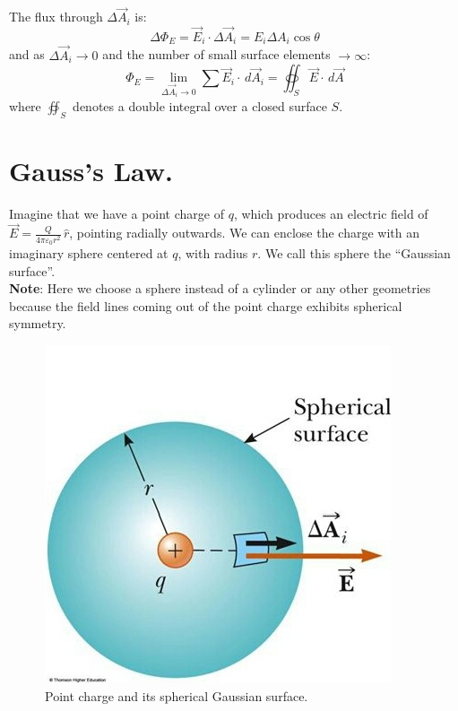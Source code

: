 \documentclass[11pt, letterpaper]{article}
\begin{document}
	The flux through $\Delta\vec{A}_i$ is: \[\Delta \Phi_E = \vec{E}_i\cdot\Delta\vec{A}_i = E_i
	\Delta A_i\cos\theta\] and as $\Delta\vec{A}_i \to 0$ and the number of small surface elements
	$\to \infty$:
	\begin{equation}
		\boxed{\Phi_E = \lim_{\Delta \vec{A}_i \to 0}\sum\vec{E}_i\cdot\, d\vec{A}_i = \oiint_S\vec{E}
		\cdot\, d\vec{A}}
	\end{equation}
	where $\oiint_S$ denotes a double integral over a closed surface $S$.
	
	\section{Gauss's Law.}
	Imagine that we have a point charge of $q$, which produces an electric field of $\vec{E} = 
	\frac{Q}{4\pi\varepsilon_0r^2}\,\hat{r}$, pointing radially outwards. We can enclose the
	charge with an imaginary sphere centered at $q$, with radius $r$. We call this sphere the
	``Gaussian surface''.\\
	\textbf{Note}: Here we choose a sphere instead of a cylinder or any other geometries 
	because the field lines coming out of the point charge exhibits spherical symmetry. 
	\begin{figure}[h!]
		\centering
		\includegraphics[scale=0.3]{sphere}
		\caption{Point charge and its spherical Gaussian surface.}
	\end{figure}
	
\end{document}
